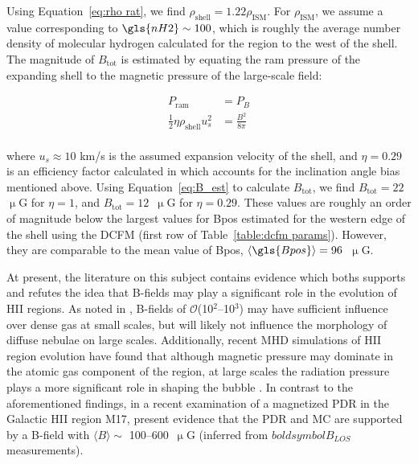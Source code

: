 Using Equation~\ref{eq:rho rat}, we find $\rho_{\mathrm{shell}} = 1.22 \rho_{\mathrm{ISM}}$. For $\rho_{\mathrm{ISM}}$, we assume a value corresponding to $\gls{nH2} \sim 100$, which is roughly the average number density of molecular hydrogen calculated for the region to the west of the shell. The magnitude of $B_{\mathrm{\mathrm{tot}}}$ is estimated by equating the ram pressure of the expanding shell to the magnetic pressure of the large-scale field:

\begin{equation}\label{eq:B_est}
  \begin{aligned}
    P_{\mathrm{ram}} &= P_{B} \\
     \frac{1}{2} \eta \rho_{\mathrm{shell}} u_{s}^{2} &= \frac{B^{2}}{8\pi} \\
  \end{aligned}
\end{equation}

where $u_{s} \approx 10$ km/s is the assumed expansion velocity of the shell, and $\eta = 0.29$ is an efficiency factor calculated in \citet{pavel2012h} which accounts for the inclination angle bias mentioned above. Using Equation~\ref{eq:B_est} to calculate $B_{\mathrm{\mathrm{tot}}}$, we find $B_{\mathrm{\mathrm{tot}}} = 22$~$\upmu$G for $\eta = 1$, and $B_{\mathrm{\mathrm{tot}}} = 12$~$\upmu$G for $\eta = 0.29$. These values are roughly an order of magnitude below the largest values for \gls{Bpos} estimated for the western edge of the shell using the DCFM (first row of Table~\ref{table:dcfm params}). However, they are comparable to the mean value of \gls{Bpos}, $\langle \gls{Bpos} \rangle = 96$~$\upmu$G.

At present, the literature on this subject contains evidence which boths supports and refutes the idea that B-fields may play a significant role in the evolution of HII regions. As noted in \citet{tremblin2014age}, B-fields of $\mathcal{O}$(10$^2$--10$^{3}$) may have sufficient influence over dense gas at small scales, but will likely not influence the morphology of diffuse nebulae on large scales. Additionally, recent MHD simulations of HII region evolution have found that although magnetic pressure may dominate in the atomic gas component of the region, at large scales the radiation pressure plays a more significant role in shaping the bubble \citep{rahner2017winds}. In contrast to the aforementioned findings, in a recent examination of a magnetized PDR in the Galactic HII region M17, \citet{pellegrini2007magnetically} present evidence that the PDR and MC are supported by a B-field with $\langle B \rangle \sim$ 100--600~$\upmu$G (inferred from $boldsymbol{B}_{{LOS}}$ measurements).

